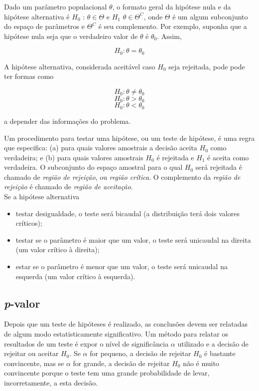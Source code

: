 Dado um parâmetro populacional $\theta$, o formato geral da hipótese nula e da hipótese alternativa é $H_0$ : $\theta \in \Theta$ e $H_1$ $\theta \in \Theta^{C}$, onde $\Theta$ é um algum subconjunto
do espaço de parâmetros e $\Theta^{C}$ é seu complemento. Por exemplo, suponha que a hipótese nula seja que o verdadeiro valor de $\theta$ é $\theta_0$. Assim,

$$ H_0 : \theta = \theta_0$$

\noindent A hipótese alternativa, considerada aceitável caso $H_0$ seja rejeitada, pode pode ter formas como

$$ H_0 : \theta \neq \theta_0$$
$$ H_0 : \theta > \theta_0$$
$$ H_0 : \theta < \theta_0$$

\noindent a depender das informações do problema. 

\noindent Um procedimento para testar uma hipótese, ou um teste de hipótese, é uma regra que especifica: (a) para quais valores amostrais a decisão aceita $H_0$ como verdadeira; e (b) para quais valores amostrais $H_0$ é rejeitada e $H_1$ é aceita como verdadeira. O subconjunto do espaço amostral para o qual $H_0$ será rejeitada é chamado de \textit{região de rejeição}, ou \textit{região crítica}. O complemento da \textit{região de rejeição} é chamado de \textit{região de aceitação}.\\

\noindent Se a hipótese alternativa 
\begin{itemize}
    \item testar desigualdade, o teste será bicaudal (a distribuição terá dois valores críticos);
    
    \item testar se o parâmetro é maior que um valor, o teste será unicaudal na direita (um valor crítico à direita);
    
    \item estar se o parâmetro é menor que um valor, o teste será unicaudal na esquerda (um valor crítico à esquerda).
\end{itemize}

\subsection{\textit{p}-valor}

Depois que um teste de hipóteses é realizado, as conclusões devem ser relatadas de algum modo estatisticamente significativo. Um método para relatar os resultados de um teste é expor o nível de significância $\alpha$ utilizado e a decisão
de rejeitar ou aceitar $H_0$. Se $\alpha$ for pequeno, a decisão de rejeitar $H_0$ é bastante convincente, mas se $\alpha$ for grande, a decisão de rejeitar $H_0$ não é muito convincente porque o teste tem uma grande probabilidade de levar, incorretamente, a esta decisão.

